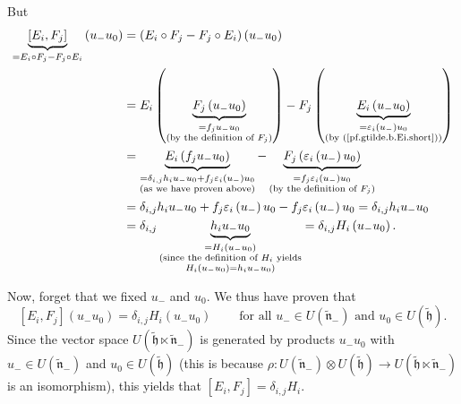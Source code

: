 \documentclass[etingof-lie.tex]{subfiles}
\begin{document}
\begin{vershort}
But%
\begin{align*}
\underbrace{\left[  E_{i},F_{j}\right]  }_{=E_{i}\circ F_{j}-F_{j}\circ E_{i}%
}\left(  u_{-}u_{0}\right)   &  =\left(  E_{i}\circ F_{j}-F_{j}\circ
E_{i}\right)  \left(  u_{-}u_{0}\right) \\
&  =E_{i}\left(  \underbrace{F_{j}\left(  u_{-}u_{0}\right)  }%
_{\substack{=f_{j}u_{-}u_{0}\\\text{(by the definition of }F_{j}\text{)}%
}}\right)  -F_{j}\left(  \underbrace{E_{i}\left(  u_{-}u_{0}\right)
}_{\substack{=\varepsilon_{i}\left(  u_{-}\right)  u_{0}\\\text{(by
(\ref{pf.gtilde.b.Ei.short}))}}}\right) \\
&  =\underbrace{E_{i}\left(  f_{j}u_{-}u_{0}\right)  }_{\substack{=\delta
_{i,j}h_{i}u_{-}u_{0}+f_{j}\varepsilon_{i}\left(  u_{-}\right)  u_{0}%
\\\text{(as we have proven above)}}}-\underbrace{F_{j}\left(  \varepsilon
_{i}\left(  u_{-}\right)  u_{0}\right)  }_{\substack{=f_{j}\varepsilon
_{i}\left(  u_{-}\right)  u_{0}\\\text{(by the definition of }F_{j}\text{)}%
}}\\
&  =\delta_{i,j}h_{i}u_{-}u_{0}+f_{j}\varepsilon_{i}\left(  u_{-}\right)
u_{0}-f_{j}\varepsilon_{i}\left(  u_{-}\right)  u_{0}=\delta_{i,j}h_{i}%
u_{-}u_{0}\\
&  =\delta_{i,j}\underbrace{h_{i}u_{-}u_{0}}_{\substack{=H_{i}\left(
u_{-}u_{0}\right)  \\\text{(since the definition of }H_{i}\text{
yields}\\H_{i}\left(  u_{-}u_{0}\right)  =h_{i}u_{-}u_{0}\text{)}}%
}=\delta_{i,j}H_{i}\left(  u_{-}u_{0}\right)  .
\end{align*}


Now, forget that we fixed $u_{-}$ and $u_{0}$. We thus have proven that%
\[
\left[  E_{i},F_{j}\right]  \left(  u_{-}u_{0}\right)  =\delta_{i,j}%
H_{i}\left(  u_{-}u_{0}\right)  \ \ \ \ \ \ \ \ \ \ \text{for all }u_{-}\in
U\left(  \widetilde{\mathfrak{n}}_{-}\right)  \text{ and }u_{0}\in U\left(
\widetilde{\mathfrak{h}}\right)  \text{.}%
\]
Since the vector space $U\left(  \widetilde{\mathfrak{h}}\ltimes
\widetilde{\mathfrak{n}}_{-}\right)  $ is generated by products $u_{-}u_{0}$
with $u_{-}\in U\left(  \widetilde{\mathfrak{n}}_{-}\right)  $ and $u_{0}\in
U\left(  \widetilde{\mathfrak{h}}\right)  $ (this is because $\rho:U\left(
\widetilde{\mathfrak{n}}_{-}\right)  \otimes U\left(  \widetilde{\mathfrak{h}%
}\right)  \rightarrow U\left(  \widetilde{\mathfrak{h}}\ltimes
\widetilde{\mathfrak{n}}_{-}\right)  $ is an isomorphism), this yields that
$\left[  E_{i},F_{j}\right]  =\delta_{i,j}H_{i}$.
\end{vershort}
\end{document}
